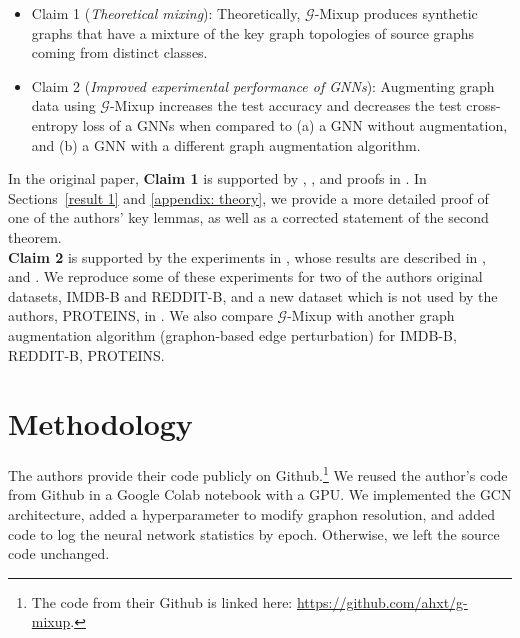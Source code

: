 \begin{itemize}
    \item Claim 1 (\textit{Theoretical mixing}): Theoretically, $\mathcal{G}$-Mixup produces synthetic graphs that have a mixture of the key graph topologies of source graphs coming from distinct classes.
    \item Claim 2 (\textit{Improved experimental performance of GNNs}): Augmenting graph data using $\mathcal{G}$-Mixup increases the test accuracy and decreases the test cross-entropy loss of a GNNs when compared to (a) a GNN without augmentation, and (b) a GNN with a different graph augmentation algorithm.
    
\end{itemize}

In the original paper, \textbf{Claim 1} is supported by \cite[Theorem 4.2]{Han:2022}, \cite[Theorem 4.3]{Han:2022}, and proofs in \cite[Appendix A]{Han:2022}. In Sections~\ref{result 1} and \ref{appendix: theory}, we provide a more detailed proof of one of the authors' key lemmas, as well as a corrected statement of the second theorem.
\\

\textbf{Claim 2} is supported by the experiments in \cite[Section 5.3]{Han:2022}, whose results are described in \cite[Table 2]{Han:2022}, and \cite[Figure 4]{Han:2022}. We reproduce some of these experiments for two of the authors original datasets, IMDB-B and REDDIT-B, and a new dataset which is not used by the authors, PROTEINS, in . We also compare $\mathcal{G}$-Mixup with another graph augmentation algorithm (graphon-based edge perturbation) for IMDB-B, REDDIT-B, PROTEINS.


\section{Methodology}

The authors provide their code publicly on Github.\footnote{The code from their Github is linked here: \href{https://github.com/ahxt/g-mixup}{https://github.com/ahxt/g-mixup}.} We reused the author's code from Github in a Google Colab notebook with a GPU. We implemented the GCN architecture, added a hyperparameter to modify graphon resolution, and added code to log the neural network statistics by epoch. Otherwise, we left the source code unchanged.


